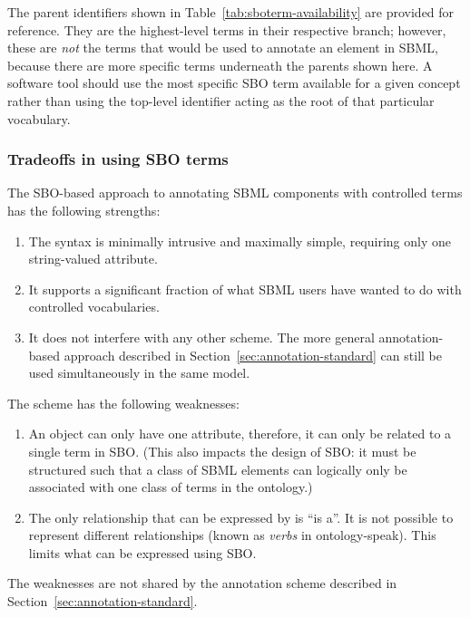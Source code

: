 The parent identifiers shown in
Table~\ref{tab:sboterm-availability} are provided for reference.
They are the highest-level terms in their respective branch;
however, these are \emph{not} the terms that would be used to
annotate an element in SBML, because there are more specific terms
underneath the parents shown here.  A software tool should use the
most specific SBO term available for a given concept rather than
using the top-level identifier acting as the root of that
particular vocabulary.




\subsubsection{Tradeoffs in using SBO terms}

The SBO-based approach to annotating SBML components with
controlled terms has the following strengths:
\begin{enumerate}

\item The syntax is minimally intrusive and maximally simple,
  requiring only one string-valued attribute.

\item It supports a significant fraction of what SBML users have wanted
  to do with controlled vocabularies.

\item It does not interfere with any other scheme.  The more
  general annotation-based approach described in
  Section~\ref{sec:annotation-standard} can still be used
  simultaneously in the same model.

\end{enumerate}

The scheme has the following weaknesses:
\begin{enumerate}

\item An object can only have one  attribute,
  therefore, it can only be related to a single term in SBO.
  (This also impacts the design of SBO: it must be structured such
  that a class of SBML elements can logically only be associated
  with one class of terms in the ontology.)

\item The only relationship that can be expressed by
   is ``is a''.  It is not possible to represent
  different relationships (known as \emph{verbs} in
  ontology-speak).  This limits what can be expressed using SBO.

\end{enumerate}
\begin{blockChanged}
The weaknesses are not shared by the annotation scheme described
in Section~\ref{sec:annotation-standard}.  
\end{blockChanged}
